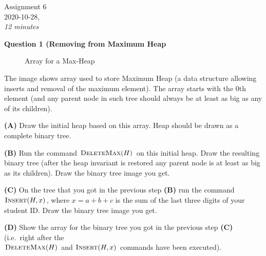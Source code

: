 \documentclass[a4paper,12pt]{article}
\begin{document}

\thispagestyle{empty}

\begin{center}
{\Large Assignment 6}\\
{\Large 2020-10-28,}\\
{\em 12 minutes} 
\end{center}

\noindent


\vspace{10pt}
{\bf Question 1 (Removing from Maximum Heap}

\begin{figure}[!htb]
\caption{\label{fig:unsorted-heap} Array for a Max-Heap}
\end{figure}

The image shows array used to store Maximum Heap 
(a data structure allowing inserts and removal of the maximum element). 
The array starts with the $0$th element 
(and any parent node in such tree should always be at least as big as 
any of its children). 

\vspace{5pt}
{\bf (A)} Draw the initial heap based on this array. 
Heap should be drawn as a complete 
binary tree.

\vspace{5pt}
{\bf (B)} Run the command $\text{\sc DeleteMax}(H)$
on this initial heap. Draw the resulting binary tree (after the heap 
invariant is restored \textendash{} any parent node is
at least as big as its children). 
Draw the binary tree image you get.

\vspace{5pt}
{\bf (C)} On the tree that you got in the previous step {\bf (B)}
run the command $\text{\sc Insert}(H,x)$, 
where $x = a+b+c$ is the sum of the last three digits of your student ID. 
Draw the binary tree image you get.

\vspace{5pt}
{\bf (D)} Show the array for the binary tree you got in the previous step {\bf (C)}
(i.e.\ right after the\\ $\text{\sc DeleteMax}(H)$ and $\text{\sc Insert}(H,x)$ commands 
have been executed). 
\end{document}
